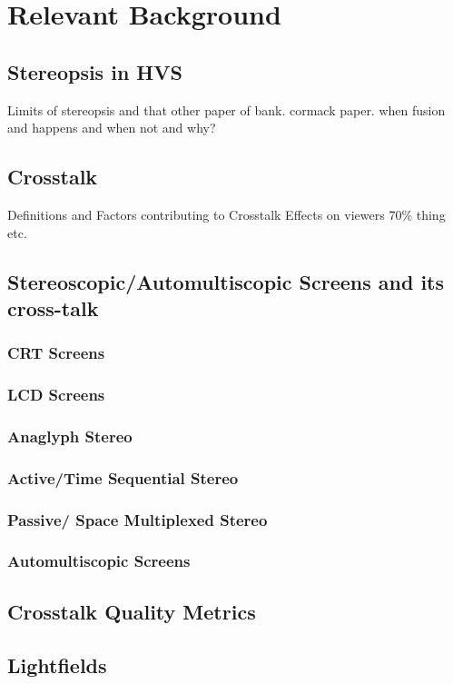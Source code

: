 \chapter{Relevant Background}
\label{chap:reletiveBackground}

\section{Stereopsis in HVS }
Limits of stereopsis and that other paper of bank.
cormack paper.
when fusion and happens and when not and why?

\section{Crosstalk}
Definitions and Factors contributing to Crosstalk
Effects on viewers
70\% thing etc.

\section{Stereoscopic/Automultiscopic Screens and its cross-talk}
\subsection{CRT Screens}
\subsection{LCD Screens}
\subsection{Anaglyph Stereo}
\subsection{Active/Time Sequential Stereo}
\subsection{Passive/ Space Multiplexed Stereo}
\subsection{Automultiscopic Screens}

\section{Crosstalk Quality Metrics}

\section{Lightfields}